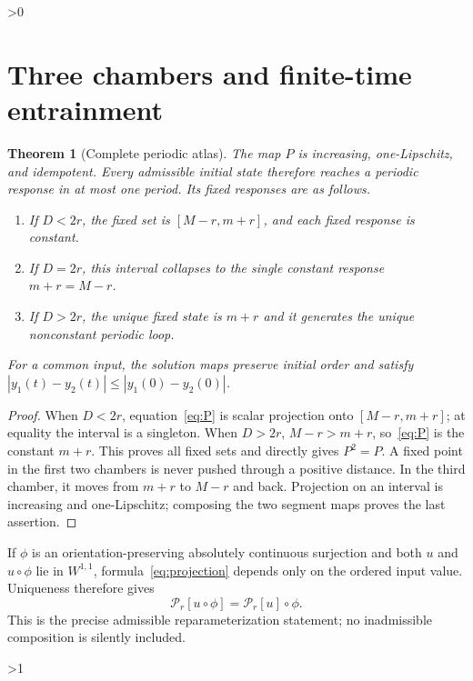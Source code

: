 \documentclass[10pt]{article}
\providecommand{\CRevisionRound}{2}
\newtheorem{theorem}{Theorem}
\begin{document}
\ifnum\CRevisionRound>0
\section{Three chambers and finite-time entrainment}
\begin{theorem}[Complete periodic atlas]\label{thm:atlas}
The map $P$ is increasing, one-Lipschitz, and idempotent.  Every admissible
initial state therefore reaches a periodic response in at most one period.
Its fixed responses are as follows.
\begin{enumerate}
\item If $D<2r$, the fixed set is $[M-r,m+r]$, and each fixed response is
constant.
\item If $D=2r$, this interval collapses to the single constant response
$m+r=M-r$.
\item If $D>2r$, the unique fixed state is $m+r$ and it generates the unique
nonconstant periodic loop.
\end{enumerate}
For a common input, the solution maps preserve initial order and satisfy
$|y_1(t)-y_2(t)|\leq|y_1(0)-y_2(0)|$.
\end{theorem}

\begin{proof}
When $D<2r$, equation~\eqref{eq:P} is scalar projection onto
$[M-r,m+r]$; at equality the interval is a singleton.  When $D>2r$,
$M-r>m+r$, so~\eqref{eq:P} is the constant $m+r$.  This proves all fixed
sets and directly gives $P^2=P$.  A fixed point in the first two chambers
is never pushed through a positive distance.  In the third chamber, it
moves from $m+r$ to $M-r$ and back.  Projection on an interval is increasing
and one-Lipschitz; composing the two segment maps proves the last assertion.
\end{proof}

If $\phi$ is an orientation-preserving absolutely continuous surjection and
both $u$ and $u\circ\phi$ lie in $W^{1,1}$, formula~\eqref{eq:projection}
depends only on the ordered input value.  Uniqueness therefore gives
\[
 \mathcal P_r[u\circ\phi]=\mathcal P_r[u]\circ\phi.
\]
This is the precise admissible reparameterization statement; no inadmissible
composition is silently included.
\fi

\ifnum\CRevisionRound>1
\end{document}
